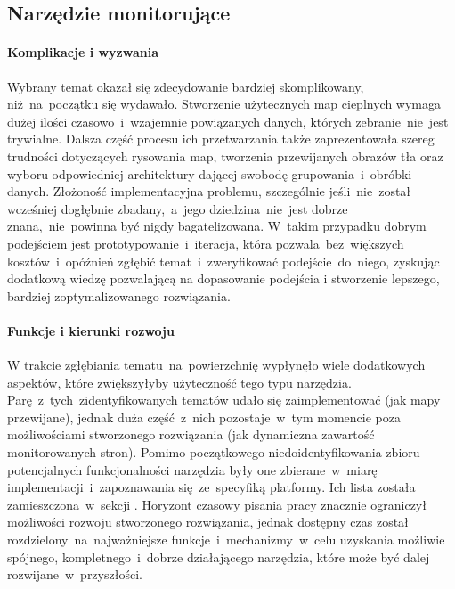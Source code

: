 \subsection{Narzędzie monitorujące}

\paragraph{Komplikacje i wyzwania}
Wybrany temat okazał się zdecydowanie bardziej skomplikowany, niż~na~początku się wydawało. Stworzenie użytecznych map cieplnych wymaga dużej ilości czasowo~i~wzajemnie powiązanych danych, których zebranie~nie~jest trywialne. Dalsza część procesu ich przetwarzania także zaprezentowała szereg trudności dotyczących rysowania map, tworzenia przewijanych obrazów tła oraz wyboru odpowiedniej architektury dającej swobodę grupowania~i~obróbki danych. Złożoność implementacyjna problemu, szczególnie jeśli~nie~został wcześniej dogłębnie zbadany,~a~jego dziedzina~nie~jest dobrze znana,~nie~powinna być nigdy bagatelizowana. W~takim przypadku dobrym podejściem jest prototypowanie~i~iteracja, która pozwala~bez~większych kosztów~i~opóźnień zgłębić temat~i~zweryfikować podejście~do~niego, zyskując dodatkową wiedzę pozwalającą na dopasowanie podejścia i stworzenie lepszego, bardziej zoptymalizowanego rozwiązania.

\paragraph{Funkcje i kierunki rozwoju}
W trakcie zgłębiania tematu~na~powierzchnię wypłynęło wiele dodatkowych aspektów, które zwiększyłyby użyteczność tego typu narzędzia. Parę~z~tych~zidentyfikowanych tematów udało się zaimplementować (jak mapy przewijane), jednak duża część~z~nich pozostaje~w~tym momencie poza możliwościami stworzonego rozwiązania (jak dynamiczna zawartość monitorowanych stron). Pomimo początkowego niedoidentyfikowania zbioru potencjalnych funkcjonalności narzędzia były one zbierane~w~miarę implementacji~i~zapoznawania się~ze~specyfiką platformy. Ich lista została zamieszczona~w~sekcji . Horyzont czasowy pisania pracy znacznie ograniczył możliwości rozwoju stworzonego rozwiązania, jednak dostępny czas został rozdzielony~na~najważniejsze funkcje~i~mechanizmy~w~celu uzyskania możliwie spójnego, kompletnego~i~dobrze działającego narzędzia, które może być dalej rozwijane~w~przyszłości.


